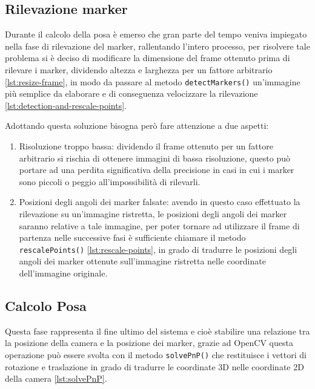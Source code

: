 \documentclass[12pt,a4paper,openright,twoside]{book}
\begin{document}
\subsection{Rilevazione marker} \label{subsec:rilevazione_marker}
Durante il calcolo della posa è emerso che gran parte del tempo veniva impiegato nella fase di rilevazione del marker, rallentando l'intero processo, per risolvere tale problema si è deciso di modificare la dimensione del frame ottenuto prima di rilevare i marker, dividendo altezza e larghezza per un fattore arbitrario \cref{lst:resize-frame}, in modo da passare al metodo \texttt{detectMarkers()} un'immagine più semplice da elaborare e di conseguenza velocizzare la rilevazione \cref{lst:detection-and-rescale-points}.



Adottando questa soluzione bisogna però fare attenzione a due aspetti:
\begin{enumerate}
	\item Risoluzione troppo bassa: dividendo il frame ottenuto per un fattore arbitrario si rischia di ottenere immagini di bassa risoluzione, questo può portare ad una perdita significativa della precisione in casi in cui i marker sono piccoli o peggio all'impossibilità di rilevarli.
	\item Posizioni degli angoli dei marker falsate: avendo in questo caso effettuato la rilevazione su un'immagine ristretta, le posizioni degli angoli dei marker saranno relative a tale immagine, per poter tornare ad utilizzare il frame di partenza nelle successive fasi è sufficiente chiamare il metodo \texttt{rescalePoints()} \cref{lst:rescale-points}, in grado di tradurre le posizioni degli angoli dei marker ottenute sull'immagine ristretta nelle coordinate dell'immagine originale.
	
\end{enumerate}
\subsection{Calcolo Posa} \label{subsec:calcolo_posa}
Questa fase rappresenta il fine ultimo del sistema e cioè stabilire una relazione tra la posizione della camera e la posizione dei marker, grazie ad OpenCV questa operazione può essere svolta con il metodo \texttt{solvePnP()}
che restituisce i vettori di rotazione e traslazione in grado di tradurre le coordinate 3D nelle coordinate 2D della camera \cref{lst:solvePnP}.
\end{document}
